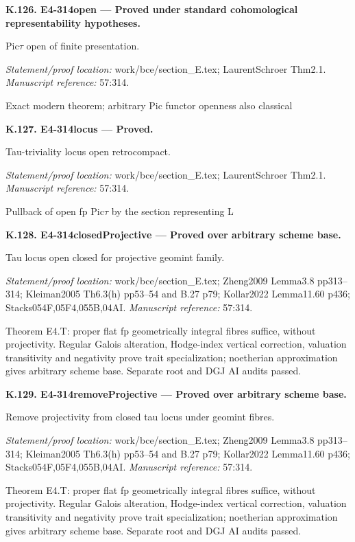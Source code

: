 \par\medskip\noindent\textbf{K.126. E4-314open --- Proved under standard cohomological representability hypotheses.}\par
Pic\ensuremath{\tau} open of finite presentation.
\par\emph{Statement/proof location:} work/bce/section\_E.tex; LaurentSchroer Thm2.1.
\emph{Manuscript reference:} 57:314.
\par Exact modern theorem; arbitrary Pic functor openness also classical
\par\medskip\noindent\textbf{K.127. E4-314locus --- Proved.}\par
Tau-triviality locus open retrocompact.
\par\emph{Statement/proof location:} work/bce/section\_E.tex; LaurentSchroer Thm2.1.
\emph{Manuscript reference:} 57:314.
\par Pullback of open fp Pic\ensuremath{\tau} by the section representing L
\par\medskip\noindent\textbf{K.128. E4-314closedProjective --- Proved over arbitrary scheme base.}\par
Tau locus open closed for projective geomint family.
\par\emph{Statement/proof location:} work/bce/section\_E.tex; Zheng2009 Lemma3.8 pp313–314; Kleiman2005 Th6.3(h) pp53–54 and B.27 p79; Kollar2022 Lemma11.60 p436; Stacks054F,05F4,055B,04AI.
\emph{Manuscript reference:} 57:314.
\par Theorem E4.T: proper flat fp geometrically integral fibres suffice, without projectivity. Regular Galois alteration, Hodge-index vertical correction, valuation transitivity and negativity prove trait specialization; noetherian approximation gives arbitrary scheme base. Separate root and DGJ AI audits passed.
\par\medskip\noindent\textbf{K.129. E4-314removeProjective --- Proved over arbitrary scheme base.}\par
Remove projectivity from closed tau locus under geomint fibres.
\par\emph{Statement/proof location:} work/bce/section\_E.tex; Zheng2009 Lemma3.8 pp313–314; Kleiman2005 Th6.3(h) pp53–54 and B.27 p79; Kollar2022 Lemma11.60 p436; Stacks054F,05F4,055B,04AI.
\emph{Manuscript reference:} 57:314.
\par Theorem E4.T: proper flat fp geometrically integral fibres suffice, without projectivity. Regular Galois alteration, Hodge-index vertical correction, valuation transitivity and negativity prove trait specialization; noetherian approximation gives arbitrary scheme base. Separate root and DGJ AI audits passed.
